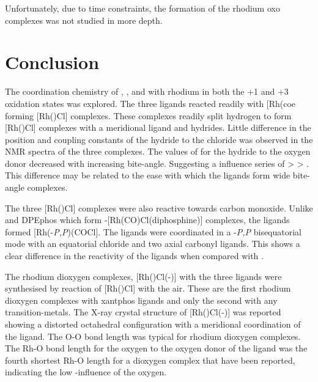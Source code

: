 Unfortunately, due to time constraints, the formation of the rhodium oxo complexes was not studied in more depth.  

\section{Conclusion}

The coordination chemistry of \tBusixantphos{}, \tButhixantphos{}, and \tBuxantphos{} with rhodium in both the +1 and +3 oxidation states was explored.  The three ligands reacted readily with [Rh(coe\ce{)2Cl]2} forming [Rh(\tBuxantphosk)Cl] complexes.  These complexes readily split hydrogen to form  [Rh(\tBuxantphosk)Cl] complexes with a meridional \tBuxantphos{} ligand and \cis{} hydrides.  Little difference in the position and coupling constants of the hydride \trans{} to the chloride was observed in the \proton{} NMR spectra of the three complexes.  The values of \JRhH{} for the hydride \trans{} to the oxygen donor decreased with increasing bite-angle.  Suggesting a \trans{} influence series of \tBuxantphos{} \textgreater{} \tButhixantphos{} \textgreater{} \tBusixantphos{}.  This difference may be related to the ease with which the ligands form wide bite-angle complexes.

The three [Rh(\tBuxantphosk)Cl] complexes were also reactive towards carbon monoxide.  Unlike \Phxantphos{} and DPEphos{} which form \trans-[Rh(CO)Cl(diphosphine)] complexes, the \tBuxantphos{} ligands formed [Rh(\tBuxantphos\dento{}-\emph{P,P}\textprime{})(COCl].  The \tBuxantphos{} ligands were coordinated in a \dento{}-\emph{P,P}\textprime{} bisequatorial mode with an equatorial chloride and two axial carbonyl ligands.  This shows a clear difference in the reactivity of the \tBuxantphos{} ligands when compared with \Phxantphos.

The rhodium dioxygen complexes, [Rh(\tBuxantphos)Cl(-)] with the three \tBuxantphos{} ligands were synthesised by reaction of  [Rh(\tBuxantphosk)Cl] with the air.  These are the first rhodium dioxygen complexes with xantphos ligands and only the second with any transition-metals.  The X-ray crystal structure of [Rh(\tBuxantphos)Cl(-)] was reported showing a distorted octahedral configuration with a meridional coordination of the \tBuxantphos{} ligand.  The O-O bond length was typical for rhodium dioxygen complexes.  The Rh-O bond length for the oxygen \trans{} to the oxygen donor of the \tBuxantphos{} ligand was the fourth shortest Rh-O length for a dioxygen complex that have been reported, indicating the low \trans-influence of the \tBuxantphos{} oxygen.  

